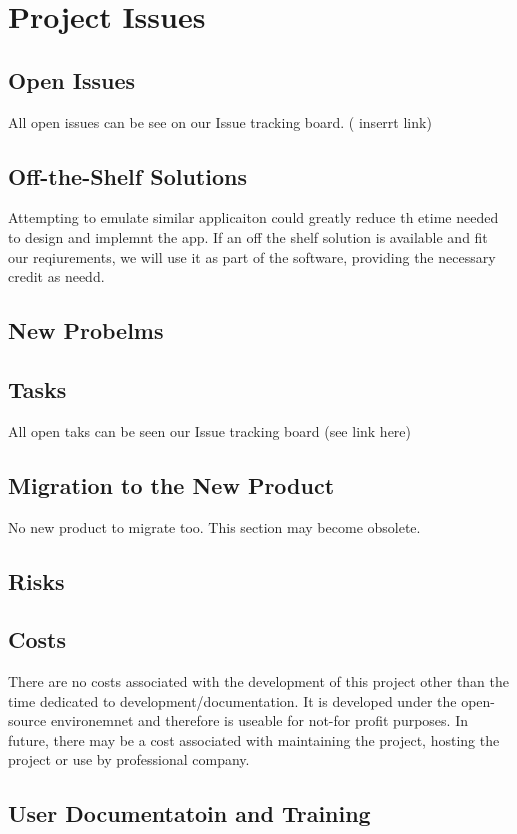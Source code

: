 \documentclass{article}
\begin{document}
\newpage
\section{Project Issues }
\subsection{Open Issues}
All open issues can be see on our Issue tracking board. ( inserrt link) 
\subsection{Off-the-Shelf Solutions}
Attempting to emulate similar applicaiton could greatly reduce th etime needed to design and implemnt the app. If an off the shelf solution is available and fit our reqiurements, we will use it as part of the software, providing the necessary credit as needd. 
\subsection{New Probelms}
\subsection{Tasks}
All open taks can be seen our Issue tracking board (see link here)
\subsection{Migration to the New Product}

No new product to migrate too. This section may become obsolete. 

\subsection{Risks}
\subsection{Costs}

There are no costs associated with the development of this project other than the time dedicated to development/documentation. It is developed under the open-source environemnet and therefore is useable for not-for profit purposes.   In future, there may be a cost associated with maintaining the project, hosting the project or use by professional company.  

\subsection{User Documentatoin and Training}
\end{document}

